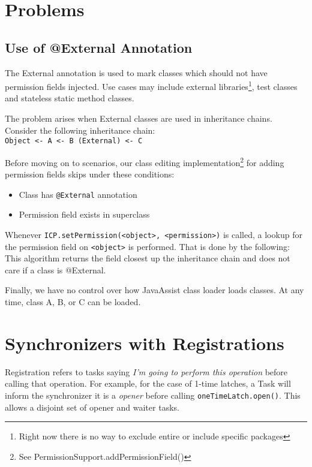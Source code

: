 \documentclass[11pt]{article}
\begin{document}
    \section{Problems}

    \subsection{Use of @External Annotation}
    The External annotation is used to mark classes which should not have permission fields injected. Use cases may
    include external libraries\footnote{Right now there is no way to exclude entire or include specific packages},
    test classes and stateless static method classes.

    The problem arises when External classes are used in inheritance chains. Consider the following inheritance chain: \\
    \texttt{Object <- A <- B (External) <- C}

    Before moving on to scenarios, our class editing implementation\footnote{See PermissionSupport.addPermissionField()}
    for adding permission fields skips under these
    conditions:
    \begin{itemize}
        \item Class has \verb|@External| annotation
        \item Permission field exists in superclass
    \end{itemize}

    Whenever \texttt{ICP.setPermission(<object>, <permission>)} is called, a lookup for the permission field on
    \verb|<object>| is performed. That is done by the following:
    This algorithm returns the field closest up the inheritance chain and does not care if a class is @External.

    Finally, we have no control over how JavaAssist class loader loads classes. At any time, class A, B, or C
    can be loaded.

    \section{Synchronizers with Registrations}
    Registration refers to tasks saying \textit{I'm going to perform this operation} before calling that operation.
    For example, for the case of 1-time latches, a Task will inform the synchronizer it is a \textit{opener} before
    calling \lstinline[]{oneTimeLatch.open()}. This allows a disjoint set of opener and waiter tasks.
\end{document}
